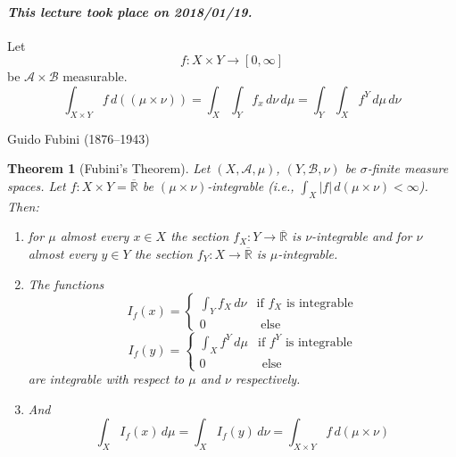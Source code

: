 \documentclass{article}
\newtheorem{theorem}{Theorem}  \numberwithin{theorem}{section}
\newcommand{\card}[1]{\left|#1\right|}
\newcommand{\dateref}[1]{\paragraph{\textit{This lecture took place on #1.}}}
\newcommand{\mtn}{(\mu\times\nu)} %
\begin{document}
\dateref{2018/01/19}

Let
\[ f: X \times Y \to [0, \infty] \]
be $\mathcal A \times \mathcal B$ measurable.
\[ \int_{X \times Y} f \, d(\mtn) = \int_X \int_Y f_x \, d\nu \, d\mu = \int_Y \int_X f^Y \, d\mu \, d\nu \]

Guido Fubini (1876--1943)

\begin{theorem}[Fubini's Theorem] %
  \label{thm:four}
  Let $(X, \mathcal A, \mu)$, $(Y, \mathcal B, \nu)$ be $\sigma$-finite measure spaces.
  Let $f: X \times Y = \overline{\mathbb R}$ be $\mtn$-integrable (i.e., $\int_X \card{f} \, d\mtn < \infty$).
  Then:
  \begin{enumerate}
    \item for $\mu$ almost every $x \in X$ the section $f_X: Y \to \overline{\mathbb R}$ is $\nu$-integrable
      and for $\nu$ almost every $y \in Y$ the section $f_Y: X \to \overline{\mathbb R}$ is $\mu$-integrable.
    \item The functions
      \[ I_f(x) = \begin{cases} \int_Y f_X \, d\nu & \text{if } f_X \text{ is integrable} \\ 0 & \text{ else} \end{cases} \]
      \[ I_f(y) = \begin{cases} \int_X f^Y \, d\mu & \text{if } f^Y \text{ is integrable} \\ 0 & \text{ else} \end{cases} \]
      are integrable with respect to $\mu$ and $\nu$ respectively.
    \item And
      \[ \int_X I_f(x) \, d\mu = \int_X I_f(y) \, d\nu = \int_{X \times Y} f \, d\mtn \]
  \end{enumerate}
\end{theorem}
\end{document}
